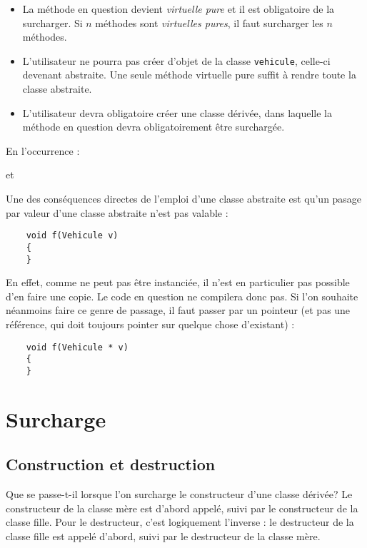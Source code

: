 \begin{itemize}

	\item La m\'ethode en question devient \emph{virtuelle pure} et il est
		obligatoire de la surcharger. Si $n$ m\'ethodes sont
		\emph{virtuelles pures}, il faut surcharger les $n$ m\'ethodes.
		
	\item L'utilisateur ne pourra pas cr\'eer d'objet de la classe
		\texttt{vehicule}, celle-ci devenant abstraite. Une seule m\'ethode virtuelle pure suffit \`a rendre toute la classe abstraite.

\item L'utilisateur devra obligatoire cr\'eer une classe d\'eriv\'ee, dans
	laquelle la m\'ethode en question devra obligatoirement \^etre
	surcharg\'ee.

\end{itemize}

En l'occurrence :


et


Une des cons\'equences directes de l'emploi d'une classe abstraite est qu'un pasage par valeur d'une classe abstraite  n'est pas valable :

\begin{lstlisting}
	void f(Vehicule v)
	{
	}
\end{lstlisting}

\warning En effet, comme  ne peut pas \^etre instanci\'ee, il n'est en particulier pas possible d'en faire une copie. Le code en question ne compilera donc pas. Si l'on souhaite n\'eanmoins faire ce genre de passage, il faut passer par un pointeur (et pas une r\'ef\'erence, qui doit toujours pointer sur quelque chose d'existant) :

\begin{lstlisting}
	void f(Vehicule * v)
	{
	}
\end{lstlisting}


\section{Surcharge}
\subsection{Construction et destruction}

Que se passe-t-il lorsque l'on surcharge le constructeur d'une classe
d\'eriv\'ee? Le constructeur de la classe m\`ere est d'abord appel\'e, suivi
par le constructeur de la classe fille.  Pour le destructeur, c'est
logiquement l'inverse : le destructeur de la classe fille est appel\'e
d'abord, suivi par le destructeur de la classe m\`ere.

